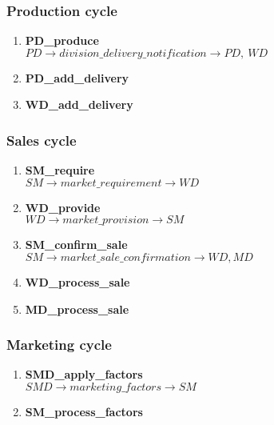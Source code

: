 \documentclass[11pt]{article}
\begin{document}
\subsubsection{Production cycle}
\begin{enumerate}
	\item \textbf{PD\_produce} \\
	$ PD \rightarrow division\_delivery\_notification \rightarrow PD,\ WD $
	\item \textbf{PD\_add\_delivery}
	\item \textbf{WD\_add\_delivery}
\end{enumerate}

\subsubsection{Sales cycle}
\begin{enumerate}
	\item \textbf{SM\_require} \\
	$ SM \rightarrow market\_requirement \rightarrow WD $
	\item \textbf{WD\_provide} \\
	$ WD \rightarrow market\_provision \rightarrow SM $
	\item \textbf{SM\_confirm\_sale} \\
	$ SM \rightarrow market\_sale\_confirmation \rightarrow WD, MD $
	\item \textbf{WD\_process\_sale}
	\item \textbf{MD\_process\_sale}
\end{enumerate}

\subsubsection{Marketing cycle}
\begin{enumerate}
	\item \textbf{SMD\_apply\_factors} \\
	$ SMD \rightarrow marketing\_factors \rightarrow SM $
	\item \textbf{SM\_process\_factors}
\end{enumerate}
\end{document}
